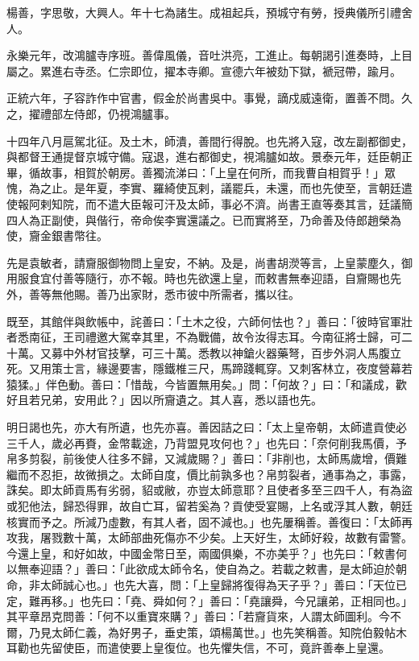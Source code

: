 \begin{pinyinscope}
楊善，字思敬，大興人。年十七為諸生。成祖起兵，預城守有勞，授典儀所引禮舍人。

永樂元年，改鴻臚寺序班。善偉風儀，音吐洪亮，工進止。每朝謁引進奏時，上目屬之。累進右寺丞。仁宗即位，擢本寺卿。宣德六年被劾下獄，褫冠帶，踰月。

正統六年，子容詐作中官書，假金於尚書吳中。事覺，謫戍威遠衛，置善不問。久之，擢禮部左侍郎，仍視鴻臚事。

十四年八月扈駕北征。及土木，師潰，善間行得脫。也先將入寇，改左副都御史，與都督王通提督京城守備。寇退，進右都御史，視鴻臚如故。景泰元年，廷臣朝正畢，循故事，相賀於朝房。善獨流涕曰：「上皇在何所，而我曹自相賀乎！」眾愧，為之止。是年夏，李實、羅綺使瓦剌，議罷兵，未還，而也先使至，言朝廷遣使報阿剌知院，而不遣大臣報可汗及太師，事必不濟。尚書王直等奏其言，廷議簡四人為正副使，與偕行，帝命俟李實還議之。已而實將至，乃命善及侍郎趙榮為使，齎金銀書幣往。

先是袁敏者，請齎服御物問上皇安，不納。及是，尚書胡濙等言，上皇蒙塵久，御用服食宜付善等隨行，亦不報。時也先欲還上皇，而敕書無奉迎語，自齎賜也先外，善等無他賜。善乃出家財，悉市彼中所需者，攜以往。

既至，其館伴與飲帳中，詫善曰：「土木之役，六師何怯也？」善曰：「彼時官軍壯者悉南征，王司禮邀大駕幸其里，不為戰備，故令汝得志耳。今南征將士歸，可二十萬。又募中外材官技擊，可三十萬。悉教以神鎗火器藥弩，百步外洞人馬腹立死。又用策士言，緣邊要害，隱鐵椎三尺，馬蹄踐輒穿。又刺客林立，夜度營幕若猿猱。」伴色動。善曰：「惜哉，今皆置無用矣。」問：「何故？」曰：「和議成，歡好且若兄弟，安用此？」因以所齎遺之。其人喜，悉以語也先。

明日謁也先，亦大有所遺，也先亦喜。善因詰之曰：「太上皇帝朝，太師遣貢使必三千人，歲必再賚，金幣載途，乃背盟見攻何也？」也先曰：「奈何削我馬價，予帛多剪裂，前後使人往多不歸，又減歲賜？」善曰：「非削也，太師馬歲增，價難繼而不忍拒，故微損之。太師自度，價比前孰多也？帛剪裂者，通事為之，事露，誅矣。即太師貢馬有劣弱，貂或敝，亦豈太師意耶？且使者多至三四千人，有為盜或犯他法，歸恐得罪，故自亡耳，留若奚為？貢使受宴賜，上名或浮其人數，朝廷核實而予之。所減乃虛數，有其人者，固不減也。」也先屢稱善。善復曰：「太師再攻我，屠戮數十萬，太師部曲死傷亦不少矣。上天好生，太師好殺，故數有雷警。今還上皇，和好如故，中國金幣日至，兩國俱樂，不亦美乎？」也先曰：「敕書何以無奉迎語？」善曰：「此欲成太師令名，使自為之。若載之敕書，是太師迫於朝命，非太師誠心也。」也先大喜，問：「上皇歸將復得為天子乎？」善曰：「天位已定，難再移。」也先曰：「堯、舜如何？」善曰：「堯讓舜，今兄讓弟，正相同也。」其平章昂克問善：「何不以重寶來購？」善曰：「若齎貨來，人謂太師圖利。今不爾，乃見太師仁義，為好男子，垂史策，頌楊萬世。」也先笑稱善。知院伯毅帖木耳勸也先留使臣，而遣使要上皇復位。也先懼失信，不可，竟許善奉上皇還。


\end{pinyinscope}
